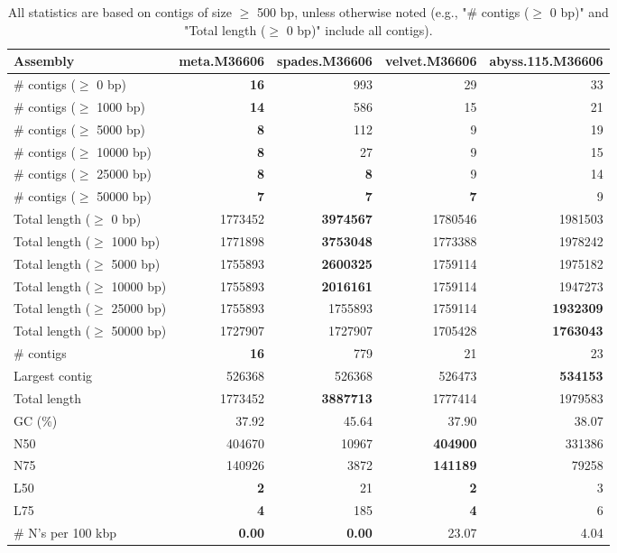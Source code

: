 \documentclass[12pt,a4paper]{article}
\begin{document}
\begin{table}[ht]
\begin{center}
\caption{All statistics are based on contigs of size $\geq$ 500 bp, unless otherwise noted (e.g., "\# contigs ($\geq$ 0 bp)" and "Total length ($\geq$ 0 bp)" include all contigs).}
\begin{tabular}{|l*{4}{|r}|}
\hline
Assembly & meta.M36606 & spades.M36606 & velvet.M36606 & abyss.115.M36606 \\ \hline
\# contigs ($\geq$ 0 bp) & {\bf 16} & 993 & 29 & 33 \\ \hline
\# contigs ($\geq$ 1000 bp) & {\bf 14} & 586 & 15 & 21 \\ \hline
\# contigs ($\geq$ 5000 bp) & {\bf 8} & 112 & 9 & 19 \\ \hline
\# contigs ($\geq$ 10000 bp) & {\bf 8} & 27 & 9 & 15 \\ \hline
\# contigs ($\geq$ 25000 bp) & {\bf 8} & {\bf 8} & 9 & 14 \\ \hline
\# contigs ($\geq$ 50000 bp) & {\bf 7} & {\bf 7} & {\bf 7} & 9 \\ \hline
Total length ($\geq$ 0 bp) & 1773452 & {\bf 3974567} & 1780546 & 1981503 \\ \hline
Total length ($\geq$ 1000 bp) & 1771898 & {\bf 3753048} & 1773388 & 1978242 \\ \hline
Total length ($\geq$ 5000 bp) & 1755893 & {\bf 2600325} & 1759114 & 1975182 \\ \hline
Total length ($\geq$ 10000 bp) & 1755893 & {\bf 2016161} & 1759114 & 1947273 \\ \hline
Total length ($\geq$ 25000 bp) & 1755893 & 1755893 & 1759114 & {\bf 1932309} \\ \hline
Total length ($\geq$ 50000 bp) & 1727907 & 1727907 & 1705428 & {\bf 1763043} \\ \hline
\# contigs & {\bf 16} & 779 & 21 & 23 \\ \hline
Largest contig & 526368 & 526368 & 526473 & {\bf 534153} \\ \hline
Total length & 1773452 & {\bf 3887713} & 1777414 & 1979583 \\ \hline
GC (\%) & 37.92 & 45.64 & 37.90 & 38.07 \\ \hline
N50 & 404670 & 10967 & {\bf 404900} & 331386 \\ \hline
N75 & 140926 & 3872 & {\bf 141189} & 79258 \\ \hline
L50 & {\bf 2} & 21 & {\bf 2} & 3 \\ \hline
L75 & {\bf 4} & 185 & {\bf 4} & 6 \\ \hline
\# N's per 100 kbp & {\bf 0.00} & {\bf 0.00} & 23.07 & 4.04 \\ \hline
\end{tabular}
\end{center}
\end{table}
\end{document}
